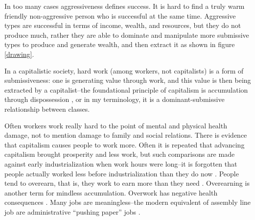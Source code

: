 \documentclass[11pt, letterpaper]{article}
\begin{document}
\begin{spacing}{2.0}
 





 
In too many cases aggressiveness defines success. It is hard to find a truly warm
friendly non-aggressive person who is successful at the same time. Aggressive types
are successful in terms of income, wealth, and resources, but they do not produce
 much, rather they are able to dominate and manipulate more submissive types to
 produce and generate wealth, and then extract it as shown in
 figure \ref{drawing}. 
 

In a capitalistic society, hard work (among workers, not capitalists) is a form of submissiveness: one is
generating value through work, and this value is then being extracted by a
capitalist--the foundational principle of capitalism is accumulation through
dispossession \citep{harvey14}, or in my terminology, it is a dominant-submissive
relationship between classes.
%

Often workers work really hard to the point of mental and physical
health damage, not to mention damage to family and social relations.
There is  evidence that capitalism causes people to work more.
Often it is repeated that advancing capitalism brought prosperity and less work,
but such comparisons are made against early industrialization when work hours
were long--it is forgotten that  people actually worked less before
industrialization than they do now \citep{schor08}. People tend to
overearn, that is, they work to earn more than they need \citep{hsee13}. Overearning is another term for mindless accumulation.
Overwork has negative health consequences \citep{artazcoz12}.
Many jobs are meaningless--the modern equivalent of assembly line job are
administrative ``pushing paper'' jobs %
 \citep{economist13aug17b}.



\end{spacing}
\end{document}
